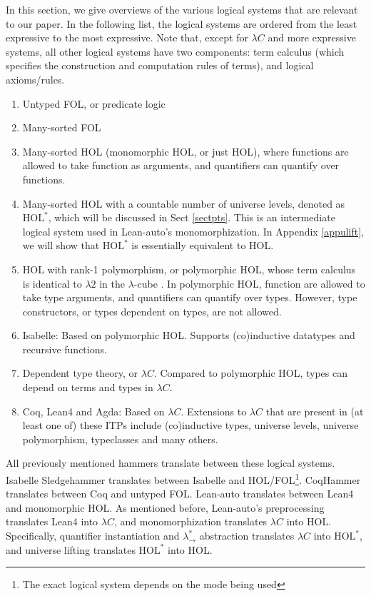   In this section, we give overviews of the various logical systems
  that are relevant to our paper. In the following list, the logical systems
  are ordered from the least expressive to the most expressive. Note that, except
  for $\lambda C$ and more expressive systems, all other logical systems have
  two components: term calculus (which specifies the construction and computation
  rules of terms), and logical axioms/rules.
  \begin{enumerate}
    \item Untyped FOL, or predicate logic
    \item Many-sorted FOL
    \item Many-sorted HOL (monomorphic HOL, or just HOL), where functions are allowed
      to take function as arguments, and quantifiers can quantify over functions.
    \item Many-sorted HOL with a countable number of universe levels, denoted as $\text{HOL}^*$,
      which will be discussed in Sect \ref{sectpts}. This is an
      intermediate logical system used in Lean-auto's monomorphization. In Appendix \ref{appulift}, we
      will show that $\text{HOL}^*$ is essentially equivalent to HOL.
    \item HOL with rank-1 polymorphism, or polymorphic HOL, whose term calculus is identical
      to $\lambda 2$ in the $\lambda$-cube \cite{LambdaWithType}. In polymorphic HOL, function are
      allowed to take type arguments, and quantifiers can quantify over types. However, type
      constructors, or types dependent on types, are not allowed.
    \item Isabelle: Based on polymorphic HOL. Supports (co)inductive datatypes and recursive functions.
    \item Dependent type theory, or $\lambda C$. Compared to polymorphic HOL, types can depend on terms and types in $\lambda C$.
    \item Coq, Lean4 and Agda: Based on $\lambda C$. Extensions to $\lambda C$ that are
      present in (at least one of) these ITPs include (co)inductive types, universe levels,
      universe polymorphism, typeclasses and many others.
  \end{enumerate}
  
  \noindent All previously mentioned hammers translate between these logical systems. Isabelle
  Sledgehammer translates between Isabelle and
  HOL/FOL\footnote{The exact logical system depends on the mode being used}.
  CoqHammer translates between Coq and untyped FOL. Lean-auto translates
  between Lean4 and monomorphic HOL. As mentioned before, Lean-auto's
  preprocessing translates Lean4 into $\lambda C$, and monomorphization
  translates $\lambda C$ into HOL. Specifically, quantifier instantiation
  and $\lambda_\to^*$ abstraction translates $\lambda C$ into $\text{HOL}^*$,
  and universe lifting translates $\text{HOL}^*$ into HOL.

